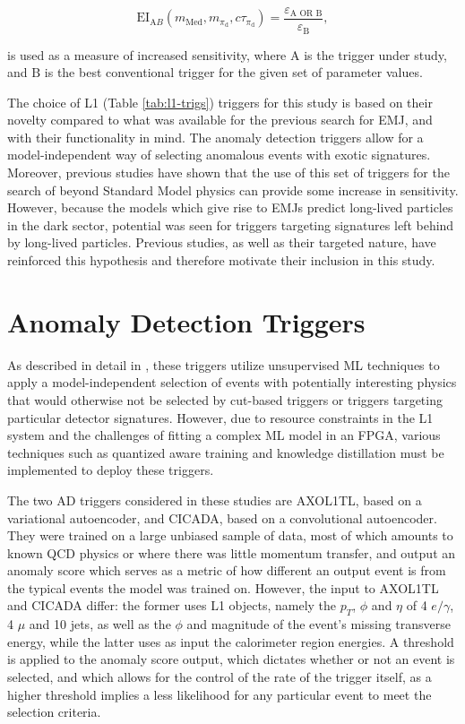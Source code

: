 \begin{equation}
    \text{EI}_{\text{A}B} (m_{\text{Med}}, m_{\pi_{\text{d}}},c\tau_{\pi_{\text{d}}}) = \frac{\varepsilon_{\text{A OR B}}}{\varepsilon_{\text{B}}},
\end{equation}

\noindent is used as a measure of increased sensitivity, where $\text{A}$ is the trigger under study, and $\text{B}$ is the best conventional trigger for the given set of parameter values.

The choice of L1 (Table \ref{tab:l1-trigs}) triggers for this study is based on their novelty compared to what was available for the previous search for EMJ, and with their functionality in mind. The anomaly detection triggers allow for a model-independent way of selecting anomalous events with exotic signatures. Moreover, previous studies \cite{govorkovaAutoencodersFPGAsRealtime2022} have shown that the use of this set of triggers for the search of beyond Standard Model physics can provide some increase in sensitivity. However, because the models which give rise to EMJs predict long-lived particles in the dark sector, potential was seen for triggers targeting signatures left behind by long-lived particles. Previous studies, as well as their targeted nature, have reinforced this hypothesis \cite{CMS-DP-2024-058} and therefore motivate their inclusion in this study.

\section{Anomaly Detection Triggers}

As described in detail in \cite{govorkovaAutoencodersFPGAsRealtime2022}, these triggers utilize unsupervised ML techniques to apply a model-independent selection of events with potentially interesting physics that would otherwise not be selected by cut-based triggers or triggers targeting particular detector signatures. However, due to resource constraints in the L1 system and the challenges of fitting a complex ML model in an FPGA, various techniques such as quantized aware training and knowledge distillation must be implemented to deploy these triggers.

The two AD triggers considered in these studies are AXOL1TL, based on a variational autoencoder, and CICADA, based on a convolutional autoencoder. They were trained on a large unbiased sample of data, most of which amounts to known QCD physics or where there was little momentum transfer, and output an anomaly score which serves as a metric of how different an output event is from the typical events the model was trained on. However, the input to AXOL1TL and CICADA differ: the former uses L1 objects, namely the $p_T$, $\phi$ and $\eta$ of 4 $e/\gamma$, 4 $\mu$ and 10 jets, as well as the $\phi$ and magnitude of the event's missing transverse energy, while the latter uses as input the calorimeter region energies. A threshold is applied to the anomaly score output, which dictates whether or not an event is selected, and which allows for the control of the rate of the trigger itself, as a higher threshold implies a less likelihood for any particular event to meet the selection criteria.

